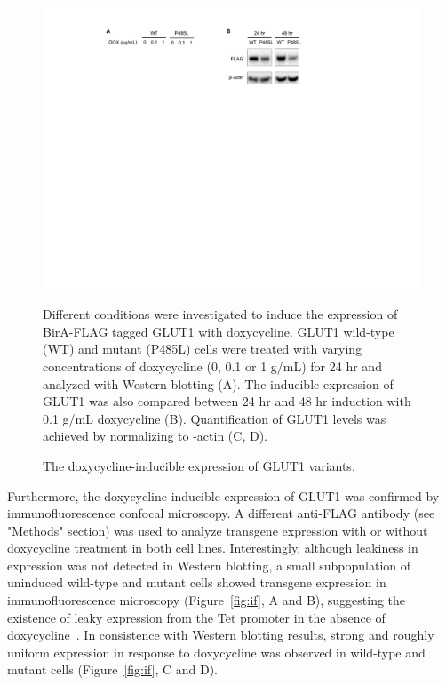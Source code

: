 \begin{figure}[h]
\centering
\includegraphics[scale=0.7]{Figures/WB}
\caption{The doxycycline-inducible expression of GLUT1 variants.}
\vspace*{-3mm}
\small \justify
Different conditions were investigated to induce the expression of BirA-FLAG tagged GLUT1 with doxycycline. GLUT1 wild-type (WT) and mutant (P485L) cells were treated with varying concentrations of doxycycline (0, 0.1 or 1 \textmu g/mL) for 24 hr and analyzed with Western blotting (A). The inducible expression of GLUT1 was also compared between 24 hr and 48 hr induction with 0.1 \textmu g/mL doxycycline (B). Quantification of GLUT1 levels was achieved by normalizing to \textbeta -actin (C, D).
\label{fig:wb}
\end{figure}
Furthermore, the doxycycline-inducible expression of GLUT1 was confirmed by immunofluorescence confocal microscopy. A different anti-FLAG antibody (see "Methods" section) was used to analyze transgene expression with or without doxycycline treatment in both cell lines. Interestingly, although leakiness in expression was not detected in Western blotting, a small subpopulation of uninduced wild-type and mutant cells showed transgene expression in immunofluorescence microscopy (Figure~\ref{fig:if}, A and B), 
suggesting the existence of leaky expression from the Tet promoter in the absence of doxycycline~\cite{Pham,Senkel}. 
In consistence with Western blotting results, strong and roughly uniform expression in response to doxycycline was observed in wild-type and mutant cells (Figure~\ref{fig:if}, C and D). 
